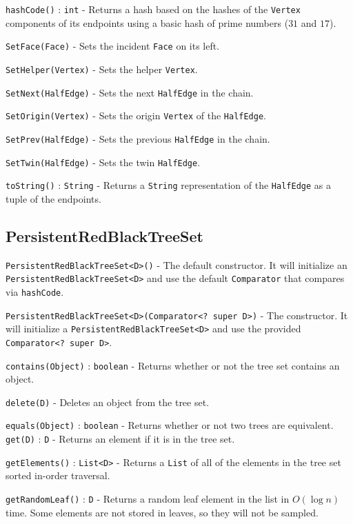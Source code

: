 \documentclass[11pt]{article}
\begin{document}
	\texttt{hashCode()} : \texttt{int} - Returns a hash based on the hashes of the \texttt{Vertex} components of its endpoints using a basic hash of prime numbers ($31$ and $17$).
	
	\texttt{SetFace(Face)} - Sets the incident \texttt{Face} on its left.
	
	\texttt{SetHelper(Vertex)} - Sets the helper \texttt{Vertex}.
	
	\texttt{SetNext(HalfEdge)} - Sets the next \texttt{HalfEdge} in the chain.
	
	\texttt{SetOrigin(Vertex)} - Sets the origin \texttt{Vertex} of the \texttt{HalfEdge}.
	
	\texttt{SetPrev(HalfEdge)} - Sets the previous \texttt{HalfEdge} in the chain.
	
	\texttt{SetTwin(HalfEdge)} - Sets the twin \texttt{HalfEdge}.
	
	\texttt{toString()} : \texttt{String} - Returns a \texttt{String} representation of the \texttt{HalfEdge} as a tuple of the endpoints.

\subsection{PersistentRedBlackTreeSet}
\label{sec:prbtree}

\texttt{PersistentRedBlackTreeSet<D>()} - The default constructor. It will initialize an \texttt{PersistentRedBlackTreeSet<D>} and use the default \texttt{Comparator} that compares via \texttt{hashCode}.

\texttt{PersistentRedBlackTreeSet<D>(Comparator<? super D>)} - The constructor. It will initialize a \texttt{PersistentRedBlackTreeSet<D>} and use the provided \texttt{Comparator<? super D>}.

\texttt{contains(Object)} : \texttt{boolean} - Returns whether or not the tree set contains an object.

\texttt{delete(D)} - Deletes an object from the tree set.

\texttt{equals(Object)} : \texttt{boolean} - Returns whether or not two trees are equivalent.
\texttt{get(D)} : \texttt{D} - Returns an element if it is in the tree set.

\texttt{getElements()} : \texttt{List<D>} - Returns a \texttt{List} of all of the elements in the tree set sorted in-order traversal.

\texttt{getRandomLeaf()} : \texttt{D} - Returns a random leaf element in the list in $O\left( \log n \right)$ time. Some elements are not stored in leaves, so they will not be sampled.
\end{document}
